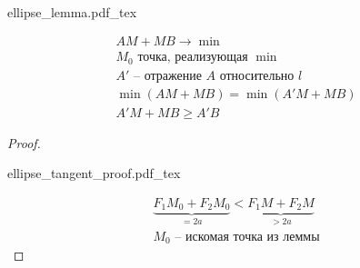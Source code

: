 \documentclass[main]{subfiles}
\begin{document}
\begin{lemma}
    \

    \noindent\begin{minipage}{0.45\textwidth}
        {ellipse_lemma.pdf_tex}
    \end{minipage}
    \begin{minipage}{0.45\textwidth}
        \begin{gather*}
            AM+MB \to \min\\
            M_0 \text{ точка, реализующая } \min\\
            A' \text{ -- отражение } A \text{ относительно } l\\
            \min(AM+MB) = \min(A'M+MB)\\
            A'M+MB \ge A'B
        \end{gather*}
    \end{minipage}
\end{lemma}

\begin{proof}
    \

    \begin{center}
        {ellipse_tangent_proof.pdf_tex}
    \end{center}
    \begin{gather*}
        \underbrace{F_1M_0 + F_2M_0}_{=2a} < \underbrace{F_1M + F_2M}_{>2a}\\
        M_0 \text{ -- искомая точка из леммы}
    \end{gather*}
\end{proof}
\end{document}
